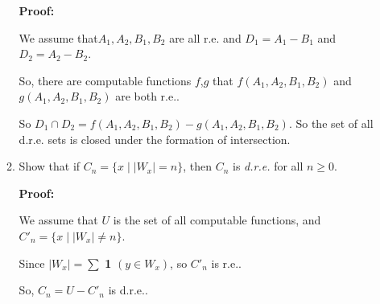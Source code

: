 \documentclass[12pt,a4paper]{article}
\theoremstyle{definition}
\numberwithin{equation}{section}
\numberwithin{figure}{section}
\begin{document}
\begin{enumerate}
\begin{enumerate}
\textbf{Proof:}

We assume that$A_1, A_2, B_1, B_2$ are all r.e. and $D_1 = A_1 - B_1$ and $D_2 = A_2 - B_2$.

So, there are computable functions $f$,$g$ that $f(A_1,A_2,B_1,B_2)$ and $g(A_1,A_2,B_1,B_2)$ are both r.e..

So $D_1 \cap D_2 = f(A_1,A_2,B_1,B_2) - g(A_1,A_2,B_1,B_2)$. So the set of all d.r.e. sets is closed under the formation of intersection.

\item Show that if $C_n = \{x \mid |W_x|=n \}$, then $C_n$ is \emph{d.r.e.} for all $n \ge 0$.

\textbf{Proof:}

We assume that $U$ is the set of all computable functions, and $C'_n =  \{x \mid |W_x| \neq n \}$.

Since $|W_x| = \sum$ \textbf{1} $(y \in W_x)$, so $C'_n$ is r.e..

So, $C_n = U - C'_n$ is d.r.e..



\end{enumerate}



\end{enumerate}
\end{document}
